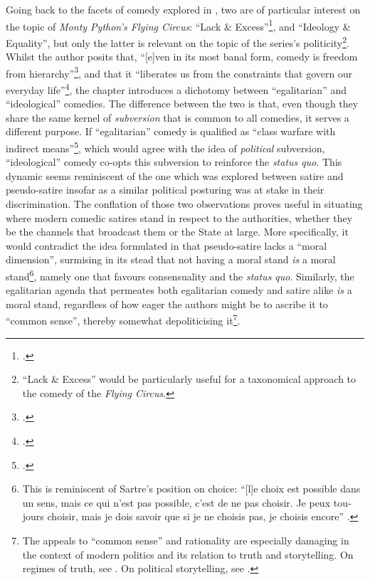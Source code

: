 \documentclass[
,a4paper
,DIV=12
,12pt
,abstract
,bibliography=totoc
]{scrartcl}
\begin{document}
Going back to the facets of comedy explored in \textcite{mcgowan2017}, two are of particular interest on the topic of \emph{Monty Python’s Flying Circus}: \enquote{Lack \& Excess}\footnote{\Cite[19--48]{mcgowan2017}.}, and \enquote{Ideology \& Equality}, but only the latter is relevant on the topic of the series’s politicity\footnote{\enquote{Lack \& Excess} would be particularly useful for a taxonomical approach to the comedy of the \emph{Flying Circus}.}.  Whilst the author posits that, \enquote{[e]ven in its most banal form, comedy is freedom from hierarchy}\footnote{\Cite[161]{mcgowan2017}.}, and that it \enquote{liberates us from the constraints that govern our everyday life}\footnote{\Cite[161]{mcgowan2017}.}, the chapter introduces a dichotomy between \enquote{egalitarian} and \enquote{ideological} comedies.  The difference between the two is that, even though they share the same kernel of \emph{subversion} that is common to all comedies, it serves a different purpose.  If \enquote{egalitarian} comedy is qualified as \enquote{class warfare with indirect means}\footnote{\Cite[162]{mcgowan2017}.}, which would agree with the idea of \emph{political} subversion, \enquote{ideological} comedy co-opts this subversion to reinforce the \emph{status quo}.  This dynamic seems reminiscent of the one which was explored between satire and pseudo-satire insofar as a similar political posturing was at stake in their discrimination.  The conflation of those two observations proves useful in situating where modern comedic satires stand in respect to the authorities, whether they be the channels that broadcast them or the State at large.  More specifically, it would contradict the idea formulated in \textcite[321]{declercq2018} that pseudo-satire lacks a \enquote{moral dimension}, surmising in its stead that not having a moral stand \emph{is} a moral stand\footnote{This is reminiscent of Sartre’s position on choice: \enquote{\foreignlanguage{french}{[l]e choix est possible dans un sens, mais ce qui n'est pas possible, c'est de ne pas choisir. Je peux toujours choisir, mais je dois savoir que si je ne choisis pas, je choisis encore}} \parencite{sartre2018}.}, namely one that favours consensuality and the \emph{status quo}.  Similarly, the egalitarian agenda that permeates both egalitarian comedy and satire alike \emph{is} a moral stand, regardless of how eager the authors might be to ascribe it to \enquote{common sense}, thereby somewhat depoliticising it\footnote{The appeals to \enquote{common sense} and rationality are especially damaging in the context of modern politics and its relation to truth and storytelling.  On regimes of truth, see \textcite{foucault1975, lorenzini2015}.  On political storytelling, see \textcite{salmon2019, salmon2008}.}.
\end{document}
